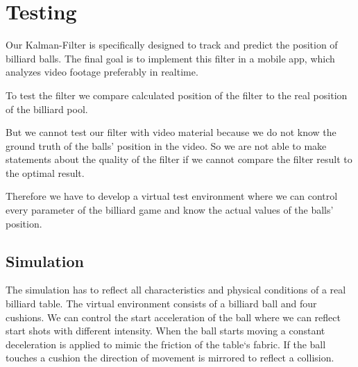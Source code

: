 \documentclass[titlepage, a4paper, 11pt]{scrartcl}
\begin{document}



    \section{Testing}

    Our Kalman-Filter is specifically designed to track and predict the position of billiard balls.
    The final goal is to implement this filter in a mobile app, which analyzes video footage preferably in realtime.

    To test the filter we compare calculated position of the filter to the real position of the billiard pool.

    But we cannot test our filter with video material because we do not know the ground truth of the balls' position in the video.
    So we are not able to make statements about the quality of the filter if we cannot compare the filter result to the optimal result.

    Therefore we have to develop a virtual test environment where we can control every parameter of the billiard game and know the actual values of the balls' position.

        \subsection{Simulation}

        The simulation has to reflect all characteristics and physical conditions of a real billiard table.
        The virtual environment consists of a billiard ball and four cushions.
        We can control the start acceleration of the ball where we can reflect start shots with different intensity.
        When the ball starts moving a constant deceleration is applied to mimic the friction of the table`s fabric.
        If the ball touches a cushion the direction of movement is mirrored to reflect a collision.
\end{document}
